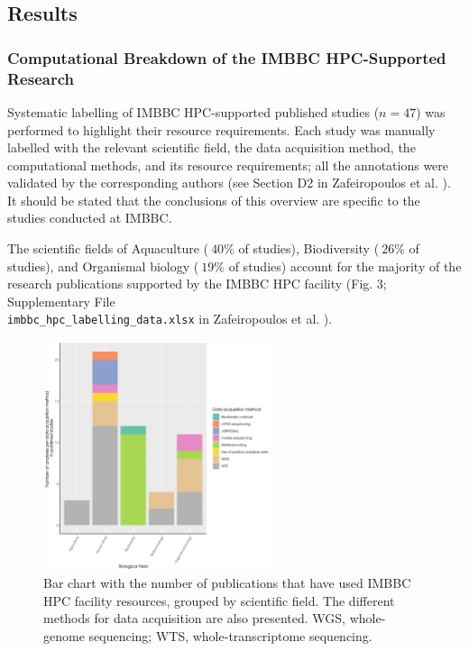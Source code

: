    \subsection{Results}

   \subsubsection*{Computational Breakdown of the IMBBC HPC-Supported Research}

   Systematic labelling of IMBBC HPC-supported published studies ($n = 47$) was performed to highlight their resource requirements. 
   Each study was manually labelled with the relevant scientific field, the data acquisition method, the computational methods, and its resource requirements; 
   all the annotations were validated by the corresponding authors (see Section D2 in Zafeiropoulos et al. \citep{haris_zafeiropoulos_2021_4665308}). 
   It should be stated that the conclusions of this overview are specific to the studies conducted at IMBBC.

   The scientific fields of Aquaculture ($~40\%$ of studies), Biodiversity ($~26\%$ of studies), and Organismal biology ($~19\%$ of studies) account for the majority of the research publications supported by the IMBBC HPC facility (Fig. 3; Supplementary File \\
   \texttt{imbbc\_hpc\_labelling\_data.xlsx} in Zafeiropoulos et al. \citep{haris_zafeiropoulos_2021_4665308}).
   

   \begin{figure}
      \centering
      \label{fig:studies}
      \includegraphics[width=0.6\textwidth]{figures/number_of_studies_biological_field_data_acquisition_method_plot.png}
      \caption[IMBBC HPC supported published studies grouped by scientific field]{
         Bar chart with the number of publications that have used IMBBC HPC facility resources, grouped by scientific field. The different methods for data acquisition are also presented. WGS, whole-genome sequencing; WTS, whole-transcriptome sequencing.
      }

   \end{figure}


